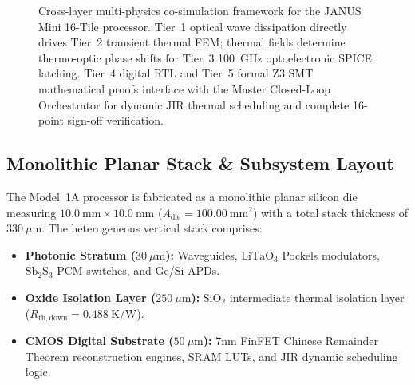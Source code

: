 \documentclass[journal]{IEEEtran}
\begin{document}
\begin{figure}[!t]
\caption{Cross-layer multi-physics co-simulation framework for the JANUS Mini 16-Tile processor. Tier~1 optical wave dissipation directly drives Tier~2 transient thermal FEM; thermal fields determine thermo-optic phase shifts for Tier~3 100~GHz optoelectronic SPICE latching. Tier~4 digital RTL and Tier~5 formal Z3 SMT mathematical proofs interface with the Master Closed-Loop Orchestrator for dynamic JIR thermal scheduling and complete 16-point sign-off verification.}
\label{fig:cosim_framework}
\end{figure}

\subsection{Monolithic Planar Stack \& Subsystem Layout}
The Model~1A processor is fabricated as a monolithic planar silicon die measuring $10.0~\mathrm{mm} \times 10.0~\mathrm{mm}$ ($A_{\mathrm{die}} = 100.00~\mathrm{mm^2}$) with a total stack thickness of $330~\mu\mathrm{m}$. The heterogeneous vertical stack comprises:
\begin{itemize}
    \item \textbf{Photonic Stratum ($30~\mu\mathrm{m}$):} Waveguides, $\mathrm{LiTaO_3}$ Pockels modulators, $\mathrm{Sb_2S_3}$ PCM switches, and Ge/Si APDs.
    \item \textbf{Oxide Isolation Layer ($250~\mu\mathrm{m}$):} $\mathrm{SiO_2}$ intermediate thermal isolation layer ($R_{\mathrm{th,down}} = 0.488~\mathrm{K/W}$).
    \item \textbf{CMOS Digital Substrate ($50~\mu\mathrm{m}$):} 7nm FinFET Chinese Remainder Theorem reconstruction engines, SRAM LUTs, and JIR dynamic scheduling logic.
\end{itemize}
\end{document}
